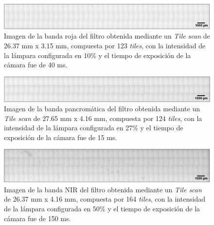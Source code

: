 \begin{figure}[H]
	\centering
	\includegraphics[width=1.0\textwidth]{Figs/cuantificaciondefectos/banda_PANC.png}
	\caption{Imagen de la banda roja del filtro obtenida mediante un \textit{Tile scan} de 26.37 mm x 3.15 mm, compuesta por 123 \textit{tiles}, con la intensidad de la lámpara configurada en 10\% y el tiempo de exposición de la cámara fue de 40 ms.}
	\label{fig:tilebandapanc}
\end{figure}
\begin{figure}[H]
	\centering
	\includegraphics[width=1.0\textwidth]{Figs/defectosZEISS/tilebandaroja.png}
	\caption{Imagen de la banda pancromática del filtro obtenida mediante un \textit{Tile scan} de 27.65 mm x 4.16 mm, compuesta por 124 \textit{tiles}, con la intensidad de la lámpara configurada en 27\% y el tiempo de exposición de la cámara fue de 15 ms.}
	\label{fig:tilebandaroja}
\end{figure}

\begin{figure}[H]
	\centering
	\includegraphics[width=1.0\textwidth]{Figs/cuantificaciondefectos/banda_NIR.png}
	\caption{Imagen de la banda NIR del filtro obtenida mediante un \textit{Tile scan} de 26.37 mm x 4.16 mm, compuesta por 164 \textit{tiles}, con la intensidad de la lámpara configurada en 50\% y el tiempo de exposición de la cámara fue de 150 ms.}
	\label{fig:tilebandanir}
\end{figure}


